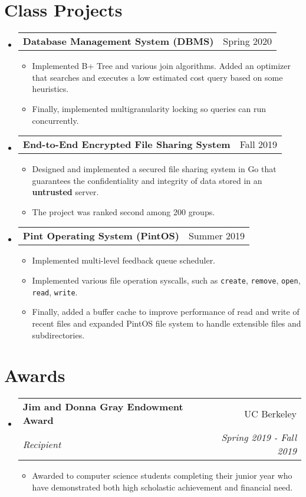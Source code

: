 \documentclass[letterpaper,11pt]{article}
\makeatletter
\newcommand{\resumeSubheading}[4]{
  \vspace{-1pt}\item
    \begin{tabular*}{0.97\textwidth}[t]{l@{\extracolsep{\fill}}r}
      \textbf{#1} & #2 \\
      \textit{\small#3} & \textit{\small #4} \\
    \end{tabular*}\vspace{-5pt}
}
\newcommand{\resumeSubHeadingListStart}{\begin{itemize}[leftmargin=*]}
\newcommand{\resumeSubHeadingListEnd}{\end{itemize}}
\newcommand{\resumeItemListStart}{\begin{itemize}}
\newcommand{\resumeItemListEnd}{\end{itemize}\vspace{-5pt}}
\newcommand{\resumeSubheadingD}[2]{
  \vspace{-1pt}\item
    \begin{tabular*}{0.97\textwidth}[t]{l@{\extracolsep{\fill}}r}
      \textbf{#1} & #2 \\
    \end{tabular*}\vspace{-5pt}
}
\newcommand{\resumeItemD}[1]{
  \item\small{
    #1 \vspace{-2pt}
  }
}
\makeatother
\begin{document}
\section{Class Projects}
\resumeSubHeadingListStart
	\resumeSubheadingD
	{Database Management System (DBMS)}{Spring 2020}
	\resumeItemListStart
		\resumeItemD
		{Implemented B+ Tree and various join algorithms. Added an optimizer that searches and executes a low estimated cost query based on some heuristics.}
		\resumeItemD
		{Finally, implemented multigranularity locking so queries can run concurrently.}
	\resumeItemListEnd
	\resumeSubheadingD
	{End-to-End Encrypted File Sharing System}{Fall 2019}
	\resumeItemListStart
		\resumeItemD
		{Designed and implemented a secured file sharing system in Go that guarantees the confidentiality and integrity of data stored in an \textbf{untrusted} server.}
		\resumeItemD
		{The project was ranked second among 200 groups.}
	\resumeItemListEnd
	\resumeSubheadingD
	{Pint Operating System (PintOS)}{Summer 2019}
	\resumeItemListStart
		\resumeItemD
		{Implemented multi-level feedback queue scheduler.}
		\resumeItemD
		{Implemented various file operation syscalls, such as \texttt{create}, \texttt{remove}, \texttt{open}, \texttt{read}, \texttt{write}.}
		\resumeItemD
		{Finally, added a buffer cache to improve performance of read and write of recent files and expanded PintOS file system to handle extensible files and subdirectories.}
	\resumeItemListEnd
\resumeSubHeadingListEnd


\section{Awards}
\resumeSubHeadingListStart
	\resumeSubheading
	{Jim and Donna Gray Endowment Award}{UC Berkeley}
	{Recipient}{Spring 2019 - Fall 2019}
	\resumeItemListStart
		\resumeItemD
		{Awarded to computer science students completing their junior year who have demonstrated both high scholastic achievement and financial need.}
	\resumeItemListEnd
\resumeSubHeadingListEnd


\end{document}
